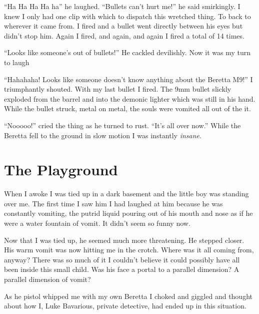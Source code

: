 ``Ha Ha Ha Ha ha'' he laughed. ``Bullets can't hurt me!'' he said
smirkingly. I knew I only had one clip with which to dispatch this
wretched thing. To back to wherever it came from. I fired and a
bullet went directly between his eyes but didn't stop him. Again I
fired, and again, and again I fired a total of 14 times.



``Looks like someone's out of bullets!'' He cackled devilishly. Now
it was my turn to laugh



``Hahahaha! Looks like someone doesn't know anything about the
Beretta M9!'' I triumphantly shouted. With my last bullet I fired.
The 9mm bullet slickly exploded from the barrel and into the
demonic lighter which was still in his hand. While the bullet
struck, metal on metal, the souls were vomited all out of the
it.



``Nooooo!'' cried the thing as he turned to rust. ``It's all over
now.'' While the Beretta fell to the ground in slow motion I was
instantly {\em insane}. 
 



\chapter{The Playground}



When I awoke I was tied up in a dark basement and the little boy
was standing over me. The first time I saw him I had laughed at him
because he was constantly vomiting, the putrid liquid pouring out
of his mouth and nose as if he were a water fountain of vomit. It
didn't seem so funny now.



Now that I was tied up, he seemed much more threatening. He stepped
closer. His warm vomit was now hitting me in the crotch. Where was
it all coming from, anyway? There was so much of it I
couldn't believe it could possibly have all been inside this
small child. Was his face a portal to a parallel dimension? A
parallel dimension of vomit?



As he pistol whipped me with my own Beretta I choked and giggled
and thought about how I, Luke Bavarious, private detective, had
ended up in this situation.




